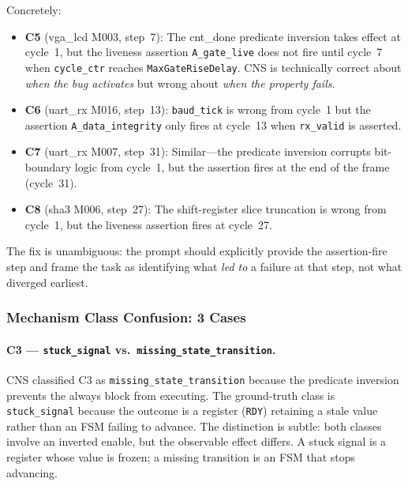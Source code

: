 \documentclass[11pt,a4paper]{article}
\begin{document}
Concretely:
\begin{itemize}
  \item \textbf{C5} (vga\_lcd M003, step~7): The cnt\_done predicate inversion
    takes effect at cycle~1, but the liveness assertion \texttt{A\_gate\_live}
    does not fire until cycle~7 when \texttt{cycle\_ctr} reaches
    \texttt{MaxGateRiseDelay}. CNS is technically correct about \emph{when the
    bug activates} but wrong about \emph{when the property fails}.
  \item \textbf{C6} (uart\_rx M016, step~13): \texttt{baud\_tick} is wrong from
    cycle~1 but the assertion \texttt{A\_data\_integrity} only fires at cycle~13
    when \texttt{rx\_valid} is asserted.
  \item \textbf{C7} (uart\_rx M007, step~31): Similar---the predicate inversion
    corrupts bit-boundary logic from cycle~1, but the assertion fires at the
    end of the frame (cycle~31).
  \item \textbf{C8} (sha3 M006, step~27): The shift-register slice truncation
    is wrong from cycle~1, but the liveness assertion fires at cycle~27.
\end{itemize}

\noindent The fix is unambiguous: the prompt should explicitly provide the
assertion-fire step and frame the task as identifying what \emph{led to} a
failure at that step, not what diverged earliest.

\subsubsection{Mechanism Class Confusion: 3 Cases}
\label{sec:analysis_mech}

\paragraph{C3 --- \texttt{stuck\_signal} vs.\ \texttt{missing\_state\_transition}.}
CNS classified C3 as \texttt{missing\_state\_transition} because the
predicate inversion prevents the always block from executing. The ground-truth
class is \texttt{stuck\_signal} because the outcome is a register (\texttt{RDY})
retaining a stale value rather than an FSM failing to advance. The distinction
is subtle: both classes involve an inverted enable, but the observable effect
differs. A stuck signal is a register whose value is frozen; a missing
transition is an FSM that stops advancing.
\end{document}
